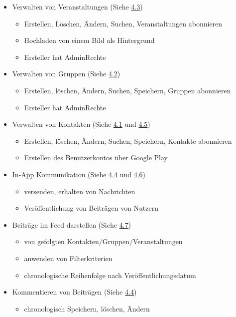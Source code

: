 \documentclass[parskip=full]{scrartcl}
\begin{document}
		\begin{itemize}
			\item Verwalten von Veranstaltungen (Siehe \hyperref[sec:FAVeranstaltungen]{4.3})
			\begin{itemize} 
				
				\item Erstellen, Löschen, Ändern, Suchen, Veranstaltungen abonnieren
				\item Hochladen von einem Bild als Hintergrund
				\item Ersteller hat \gls{AdminRechte}
			\end{itemize}
			
			\item Verwalten von Gruppen (Siehe \hyperref[sec:FAGruppe]{4.2})
			\begin{itemize}
				\item Erstellen, löschen, Ändern, Suchen, Speichern, Gruppen abonnieren
				\item Ersteller hat \gls{AdminRechte}
			\end{itemize}
			\item Verwalten von Kontakten (Siehe \hyperref[sec:FAFreunde]{4.1} und \hyperref[sec:FAKonto]{4.5}) 
			\begin{itemize}
				\item Erstellen, löschen, Ändern, Suchen, Speichern, Kontakte abonnieren
				\item Erstellen des Benutzerkontos über Google Play
			\end{itemize}
			\item In-\gls{App} Kommunikation (Siehe \hyperref[sec:FABeiträge]{4.4} und \hyperref[sec:FANachrichten]{4.6}) 
			\begin{itemize}
				\item versenden, erhalten von Nachrichten
				\item Veröffentlichung von Beiträgen von Nutzern
			\end{itemize}
			\item Beiträge im \gls{Feed} darstellen (Siehe \hyperref[sec:FAFeed]{4.7}) 
			\begin{itemize}
				\item von gefolgten Kontakten/Gruppen/Veranstaltungen
				\item anwenden von Filterkriterien
				\item chronologische Reihenfolge nach Veröffentlichungsdatum
			\end{itemize}
			\item Kommentieren von Beiträgen (Siehe \hyperref[sec:FABeiträge]{4.4}) 
			\begin{itemize}
				\item chronologisch Speichern, löschen, Ändern
			\end{itemize}	
		\end{itemize}
		
\end{document}

